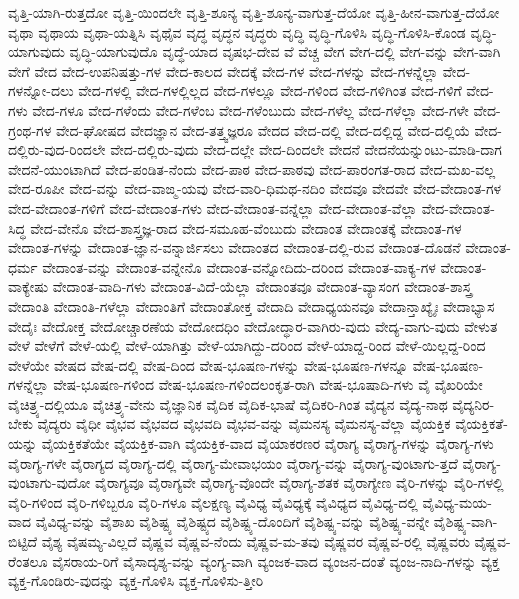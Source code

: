{ವೃತ್ತಿ-ಯಾಗಿ-ರುತ್ತದೋ
ವೃತ್ತಿ-ಯಿಂದಲೇ
ವೃತ್ತಿ-ಶೂನ್ಯ
ವೃತ್ತಿ-ಶೂನ್ಯ-ವಾಗುತ್ತ-ದೆಯೋ
ವೃತ್ತಿ-ಹೀನ-ವಾಗುತ್ತ-ದೆಯೋ
ವೃಥಾ
ವೃಥಾಯ
ವೃಥಾ-ಯತ್ನಿಸಿ
ವೃಥೈವ
ವೃದ್ಧ
ವೃದ್ಧನ
ವೃದ್ಧರು
ವೃದ್ಧಿ
ವೃದ್ಧಿ-ಗೊಳಿಸಿ
ವೃದ್ಧಿ-ಗೊಳಿಸಿ-ಕೊಂಡ
ವೃದ್ಧಿ-ಯಾಗುವುದು
ವೃದ್ಧಿ-ಯಾಗುವುದೊ
ವೃದ್ಧೆ-ಯಾದ
ವೃಷಭ-ದೇವ
ವೆ
ವೆಚ್ಚ
ವೇಗ
ವೇಗ-ದಲ್ಲಿ
ವೇಗ-ವನ್ನು
ವೇಗ-ವಾಗಿ
ವೇಗೆ
ವೇದ
ವೇದ-ಉಪನಿಷತ್ತು-ಗಳ
ವೇದ-ಕಾಲದ
ವೇದಕ್ಕೆ
ವೇದ-ಗಳ
ವೇದ-ಗಳನ್ನು
ವೇದ-ಗಳನ್ನೆಲ್ಲಾ
ವೇದ-ಗಳನ್ನೋ-ದಲು
ವೇದ-ಗಳಲ್ಲಿ
ವೇದ-ಗಳಲ್ಲಿಲ್ಲದ
ವೇದ-ಗಳಲ್ಲೂ
ವೇದ-ಗಳಿಂದ
ವೇದ-ಗಳಿಗಿಂತ
ವೇದ-ಗಳಿಗೆ
ವೇದ-ಗಳು
ವೇದ-ಗಳೂ
ವೇದ-ಗಳೆಂದು
ವೇದ-ಗಳೆಂಬ
ವೇದ-ಗಳೆಂಬುದು
ವೇದ-ಗಳೆಲ್ಲ
ವೇದ-ಗಳೆಲ್ಲಾ
ವೇದ-ಗಳೇ
ವೇದ-ಗ್ರಂಥ-ಗಳ
ವೇದ-ಘೋಷದ
ವೇದಜ್ಞಾನ
ವೇದ-ತತ್ತ್ವಜ್ಞರೂ
ವೇದದ
ವೇದ-ದಲ್ಲಿ
ವೇದ-ದಲ್ಲಿದ್ದ
ವೇದ-ದಲ್ಲಿಯೆ
ವೇದ-ದಲ್ಲಿರು-ವುದ-ರಿಂದಲೇ
ವೇದ-ದಲ್ಲಿರು-ವುದು
ವೇದ-ದಲ್ಲೇ
ವೇದ-ದಿಂದಲೇ
ವೇದನೆ
ವೇದನೆಯನ್ನುಂಟು-ಮಾಡಿ-ದಾಗ
ವೇದನೆ-ಯುಂಟಾಗಿದೆ
ವೇದ-ಪಂಡಿತ-ನೆಂದು
ವೇದ-ಪಾಠ
ವೇದ-ಪಾಠವು
ವೇದ-ಪಾರಂಗತ-ರಾದ
ವೇದ-ಮಖ-ವಲ್ಲ
ವೇದ-ರೂಪೀ
ವೇದ-ವನ್ನು
ವೇದ-ವಾಙ್ಮ-ಯವು
ವೇದ-ವಾರಿ-ಧಿಮಥ-ನದಿಂ
ವೇದವೂ
ವೇದವೇ
ವೇದ-ವೇದಾಂತ-ಗಳ
ವೇದ-ವೇದಾಂತ-ಗಳಿಗೆ
ವೇದ-ವೇದಾಂತ-ಗಳು
ವೇದ-ವೇದಾಂತ-ವನ್ನೆಲ್ಲಾ
ವೇದ-ವೇದಾಂತ-ವೆಲ್ಲಾ
ವೇದ-ವೇದಾಂತ-ಸಿದ್ಧ
ವೇದ-ವೇನೊ
ವೇದ-ಶಾಸ್ತ್ರಜ್ಞ-ರಾದ
ವೇದ-ಸಮೂಹ-ವೆಂಬುದು
ವೇದಾಂತ
ವೇದಾಂತಕ್ಕೆ
ವೇದಾಂತ-ಗಳ
ವೇದಾಂತ-ಗಳನ್ನು
ವೇದಾಂತ-ಜ್ಞಾನ-ವನ್ನಾರ್ಜಿಸಲು
ವೇದಾಂತದ
ವೇದಾಂತ-ದಲ್ಲಿ-ರುವ
ವೇದಾಂತ-ದೊಡನೆ
ವೇದಾಂತ-ಧರ್ಮ
ವೇದಾಂತ-ವನ್ನು
ವೇದಾಂತ-ವನ್ನೇನೊ
ವೇದಾಂತ-ವನ್ನೋದಿದು-ದರಿಂದ
ವೇದಾಂತ-ವಾಕ್ಯ-ಗಳ
ವೇದಾಂತ-ವಾಕ್ಯೇಷು
ವೇದಾಂತ-ವಾದಿ-ಗಳು
ವೇದಾಂತ-ವಿದೆ-ಯೆಲ್ಲಾ
ವೇದಾಂತವೂ
ವೇದಾಂತ-ವ್ಯಾಸಂಗ
ವೇದಾಂತ-ಶಾಸ್ತ್ರ
ವೇದಾಂತಿ
ವೇದಾಂತಿ-ಗಳೆಲ್ಲಾ
ವೇದಾಂತಿಗೆ
ವೇದಾಂತೋಕ್ತ
ವೇದಾದಿ
ವೇದಾಧ್ಯಯನವೂ
ವೇದಾನ್ತಾಖ್ಯೈಃ
ವೇದಾಭ್ಯಾಸ
ವೇದೈಃ
ವೇದೋಕ್ತ
ವೇದೋಚ್ಚಾರಣೆಯ
ವೇದೋದಧಿಂ
ವೇದೋದ್ಧಾರ-ವಾಗಿರು-ವುದು
ವೇದ್ಯ-ವಾಗು-ವುದು
ವೇಳುತ
ವೇಳೆ
ವೇಳೆಗೆ
ವೇಳೆ-ಯಲ್ಲಿ
ವೇಳೆ-ಯಾಗಿತ್ತು
ವೇಳೆ-ಯಾಗಿದ್ದು-ದರಿಂದ
ವೇಳೆ-ಯಾದ್ದ-ರಿಂದ
ವೇಳೆ-ಯಿಲ್ಲದ್ದ-ರಿಂದ
ವೇಳೆಯೇ
ವೇಷದ
ವೇಷ-ದಲ್ಲಿ
ವೇಷ-ದಿಂದ
ವೇಷ-ಭೂಷಣ-ಗಳನ್ನು
ವೇಷ-ಭೂಷಣ-ಗಳನ್ನೂ
ವೇಷ-ಭೂಷಣ-ಗಳನ್ನೆಲ್ಲಾ
ವೇಷ-ಭೂಷಣ-ಗಳಿಂದ
ವೇಷ-ಭೂಷಣ-ಗಳಿಂದಲಂಕೃತ-ರಾಗಿ
ವೇಷ-ಭೂಷಾದಿ-ಗಳು
ವೈ
ವೈಖರಿಯೇ
ವೈಚಿತ್ರ್ಯ-ದಲ್ಲಿಯೂ
ವೈಚಿತ್ರ್ಯ-ವೇನು
ವೈಜ್ಞಾನಿಕ
ವೈದಿಕ
ವೈದಿಕ-ಭಾಷೆ
ವೈದಿಕರಿ-ಗಿಂತ
ವೈದ್ಯನ
ವೈದ್ಯ-ನಾಥ
ವೈದ್ಯನಿರ-ಬೇಕು
ವೈದ್ಯರು
ವೈಧೀ
ವೈಭವ
ವೈಭವದ
ವೈಭವದಿ
ವೈಭವ-ವನ್ನು
ವೈಮನಸ್ಯ
ವೈಮನಸ್ಯ-ವೆಲ್ಲಾ
ವೈಯಕ್ತಿಕ
ವೈಯಕ್ತಿಕತೆ-ಯನ್ನು
ವೈಯಕ್ತಿಕತೆಯೇ
ವೈಯಕ್ತಿಕ-ವಾಗಿ
ವೈಯಕ್ತಿಕ-ವಾದ
ವೈಯಾಕರಣರ
ವೈರಾಗ್ಯ
ವೈರಾಗ್ಯ-ಗಳನ್ನು
ವೈರಾಗ್ಯ-ಗಳು
ವೈರಾಗ್ಯ-ಗಳೇ
ವೈರಾಗ್ಯದ
ವೈರಾಗ್ಯ-ದಲ್ಲಿ
ವೈರಾಗ್ಯ-ಮೇವಾಭಯಂ
ವೈರಾಗ್ಯ-ವನ್ನು
ವೈರಾಗ್ಯ-ವುಂಟಾಗು-ತ್ತದೆ
ವೈರಾಗ್ಯ-ವುಂಟಾಗು-ವುದೋ
ವೈರಾಗ್ಯವೂ
ವೈರಾಗ್ಯವೇ
ವೈರಾಗ್ಯ-ವೊಂದೇ
ವೈರಾಗ್ಯ-ಶತಕ
ವೈರಾಗ್ಯೇಣ
ವೈರಿ-ಗಳನ್ನು
ವೈರಿ-ಗಳಲ್ಲಿ
ವೈರಿ-ಗಳಿಂದ
ವೈರಿ-ಗಳಿಬ್ಬರೂ
ವೈರಿ-ಗಳೂ
ವೈಲಕ್ಷಣ್ಯ
ವೈವಿಧ್ಯ
ವೈವಿಧ್ಯಕ್ಕೆ
ವೈವಿಧ್ಯದ
ವೈವಿಧ್ಯ-ದಲ್ಲಿ
ವೈವಿಧ್ಯ-ಮಯ-ವಾದ
ವೈವಿಧ್ಯ-ವನ್ನು
ವೈಶಾಖ
ವೈಶಿಷ್ಟ್ಯ
ವೈಶಿಷ್ಟ್ಯದ
ವೈಶಿಷ್ಟ್ಯ-ದೊಂದಿಗೆ
ವೈಶಿಷ್ಟ್ಯ-ವನ್ನು
ವೈಶಿಷ್ಟ್ಯ-ವನ್ನೇ
ವೈಶಿಷ್ಟ್ಯ-ವಾಗಿ-ಬಿಟ್ಟಿದೆ
ವೈಶ್ಯ
ವೈಷಮ್ಯ-ವಿಲ್ಲದೆ
ವೈಷ್ಣವ
ವೈಷ್ಣವ-ನೆಂದು
ವೈಷ್ಣವ-ಮ-ತವು
ವೈಷ್ಣವರ
ವೈಷ್ಣವ-ರಲ್ಲಿ
ವೈಷ್ಣವರು
ವೈಷ್ಣವ-ರೆಂತಲೂ
ವೈಸರಾಯ-ರಿಗೆ
ವೈಸಾದೃಶ್ಯ-ವನ್ನು
ವ್ಯಂಗ್ಯ-ವಾಗಿ
ವ್ಯಂಜಕ-ವಾದ
ವ್ಯಂಜನ-ದಂತೆ
ವ್ಯಂಜ-ನಾದಿ-ಗಳನ್ನು
ವ್ಯಕ್ತ
ವ್ಯಕ್ತ-ಗೊಂಡಿರು-ವುದನ್ನು
ವ್ಯಕ್ತ-ಗೊಳಿಸಿ
ವ್ಯಕ್ತ-ಗೊಳಿಸು-ತ್ತೀರಿ
}
